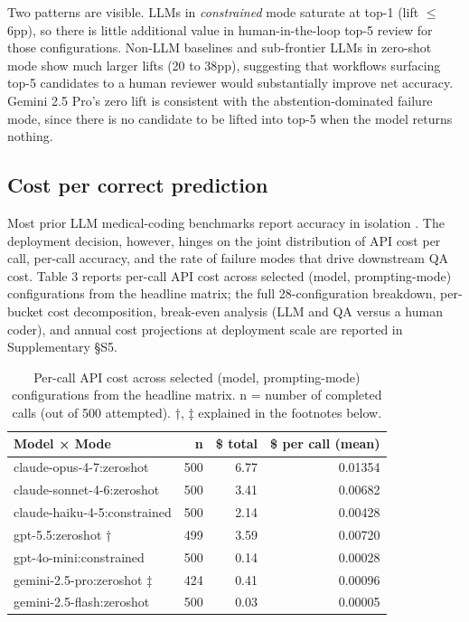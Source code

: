 Two patterns are visible. LLMs in \emph{constrained} mode saturate
at top-1 (lift $\leq$6pp), so there is little additional value in
human-in-the-loop top-5 review for those configurations.
Non-LLM baselines and sub-frontier LLMs in zero-shot mode show
much larger lifts (20 to 38pp), suggesting that workflows
surfacing top-5 candidates to a human reviewer would substantially
improve net accuracy. Gemini 2.5 Pro's zero lift is consistent
with the abstention-dominated failure mode, since there is no
candidate to be lifted into top-5 when the model returns nothing.

\subsection{Cost per correct prediction}\label{cost-per-correct-prediction}

Most prior LLM medical-coding benchmarks report accuracy in
isolation \autocite{Soroush2024,Almeida2025,Singh2025}. The deployment
decision, however, hinges on the joint distribution of API cost
per call, per-call accuracy, and the rate of failure modes that
drive downstream QA cost. Table 3 reports per-call API cost across
selected (model, prompting-mode) configurations from the headline
matrix; the full 28-configuration breakdown, per-bucket cost
decomposition, break-even analysis (LLM and QA versus a human
coder), and annual cost projections at deployment scale are
reported in Supplementary §S5.

\begin{table}[!t]
\centering
\caption{Per-call API cost across selected (model, prompting-mode) configurations from the headline matrix. n = number of completed calls (out of 500 attempted). †, ‡ explained in the footnotes below.}
\begin{tabular}{@{}lrrr@{}}
\toprule
Model × Mode & n & \$ total & \$ per call (mean) \\
\midrule
claude-opus-4-7:zeroshot & 500 & 6.77 & 0.01354 \\
claude-sonnet-4-6:zeroshot & 500 & 3.41 & 0.00682 \\
claude-haiku-4-5:constrained & 500 & 2.14 & 0.00428 \\
gpt-5.5:zeroshot † & 499 & 3.59 & 0.00720 \\
gpt-4o-mini:constrained & 500 & 0.14 & 0.00028 \\
gemini-2.5-pro:zeroshot ‡ & 424 & 0.41 & 0.00096 \\
gemini-2.5-flash:zeroshot & 500 & 0.03 & 0.00005 \\
\bottomrule
\end{tabular}
\end{table}

